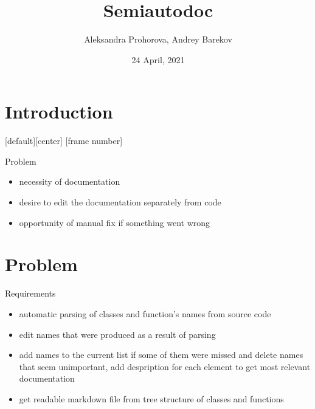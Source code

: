 \documentclass{beamer}
\title[Your Short Title]{Semiautodoc}
\author{Aleksandra Prohorova, Andrey Barekov}
\date{24 April, 2021}
\begin{document}
\begin{frame}
  \titlepage
\end{frame}


\section{}

\section{Introduction}
[default][center]
[frame number]
\begin{frame}
{Problem}
\begin{itemize}
\item{necessity of documentation}
\item{desire to edit the documentation separately from code}
\item{opportunity of manual fix if something went wrong }
\end{itemize}

\vskip 1cm

\end{frame}

\section{Problem}
\begin{frame}
{Requirements}

\begin{itemize}
\item{automatic parsing of classes and function's names from source code}
\item{edit names that were produced as a result of parsing}
\item{add names to the current list if some of them were missed and delete names that seem unimportant, add despription for each element to get most relevant documentation}
\item{get readable markdown file from tree structure of classes and functions}
\end{itemize}


\hskip 2.1cm

\end{frame}
\end{document}
